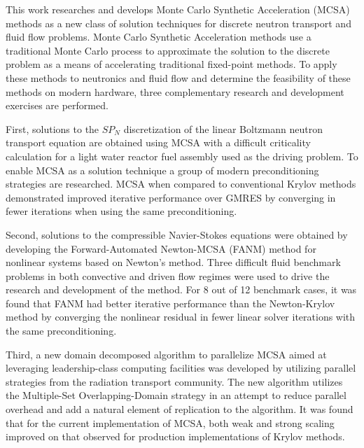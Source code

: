 This work researches and develops Monte Carlo Synthetic Acceleration
(MCSA) methods as a new class of solution techniques for discrete
neutron transport and fluid flow problems. Monte Carlo Synthetic
Acceleration methods use a traditional Monte Carlo process to
approximate the solution to the discrete problem as a means of
accelerating traditional fixed-point methods. To apply these methods
to neutronics and fluid flow and determine the feasibility of these
methods on modern hardware, three complementary research and
development exercises are performed.

First, solutions to the $SP_N$ discretization of the linear Boltzmann
neutron transport equation are obtained using MCSA with a difficult
criticality calculation for a light water reactor fuel assembly used
as the driving problem. To enable MCSA as a solution technique a group
of modern preconditioning strategies are researched. MCSA when
compared to conventional Krylov methods demonstrated improved
iterative performance over GMRES by converging in fewer iterations
when using the same preconditioning.

Second, solutions to the compressible Navier-Stokes equations were
obtained by developing the Forward-Automated Newton-MCSA (FANM) method
for nonlinear systems based on Newton's method. Three difficult fluid
benchmark problems in both convective and driven flow regimes were
used to drive the research and development of the method. For 8 out of
12 benchmark cases, it was found that FANM had better iterative
performance than the Newton-Krylov method by converging the nonlinear
residual in fewer linear solver iterations with the same
preconditioning.

Third, a new domain decomposed algorithm to parallelize MCSA aimed at
leveraging leadership-class computing facilities was developed by
utilizing parallel strategies from the radiation transport
community. The new algorithm utilizes the Multiple-Set
Overlapping-Domain strategy in an attempt to reduce parallel overhead
and add a natural element of replication to the algorithm. It was
found that for the current implementation of MCSA, both weak and
strong scaling improved on that observed for production
implementations of Krylov methods.
